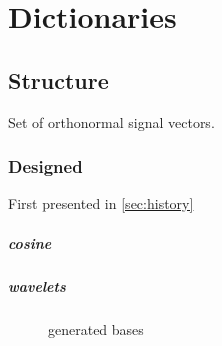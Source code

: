 \chapter{Dictionaries}

\section{Structure}
Set of orthonormal signal vectors.
\subsection{Designed}

First presented in \ref{sec:history}

\paragraph{cosine}


\paragraph{wavelets}

\begin{figure}
\centering
{}
\hspace{5mm}
\hspace{5mm}
\caption{generated bases}

\label{fig:16_1000_lasso}
\end{figure}


